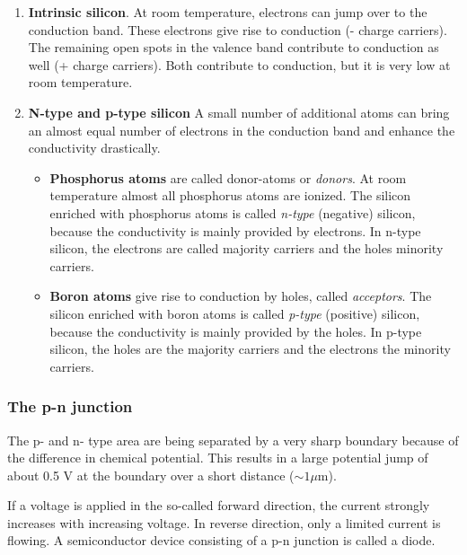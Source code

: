\documentclass[a4paper,10pt]{article}
\begin{document}
\begin{enumerate}
 \item \textbf{Intrinsic silicon}. At room temperature, electrons can jump over to the conduction band. These electrons give rise to conduction (- charge carriers). The remaining open spots in the valence band contribute to conduction as well (+ charge carriers). Both contribute to conduction, but it is very low at room temperature.
 \item \textbf{N-type and p-type silicon} A small number of additional atoms can bring an almost equal number of electrons in the conduction band and enhance the conductivity drastically.
 \begin{itemize}
  \item \textbf{Phosphorus atoms} are called donor-atoms or \emph{donors}. At room temperature almost all phosphorus atoms are ionized. The silicon enriched with phosphorus atoms is called \emph{n-type} (negative) silicon, because the conductivity is mainly provided by electrons. In n-type silicon, the electrons are called majority carriers and the holes minority carriers.
  \item \textbf{Boron atoms} give rise to conduction by holes, called \emph{acceptors}. The silicon enriched with boron atoms is called \emph{p-type} (positive) silicon, because the conductivity is mainly provided by the holes. In p-type silicon, the holes are the majority carriers and the electrons the minority carriers.
 \end{itemize}
\end{enumerate}

\subsubsection{The p-n junction}

The p- and n- type area are being separated by a very sharp boundary because of the difference in chemical potential. This results in a large potential jump of about 0.5 V at the boundary over a short distance ($\sim 1 \mu$m). \bigskip

If a voltage is applied in the so-called forward direction, the current strongly increases with increasing voltage. In reverse direction, only a limited current is flowing. A semiconductor device consisting of a p-n junction is called a diode. 
\end{document}
